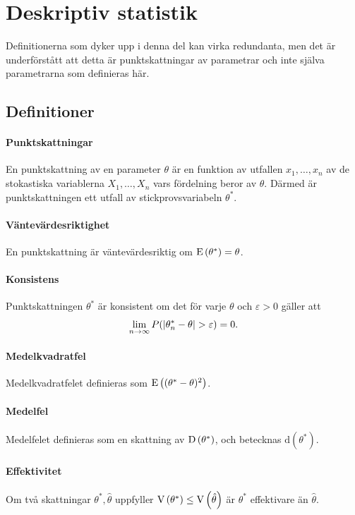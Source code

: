 \section{Deskriptiv statistik}
Definitionerna som dyker upp i denna del kan virka redundanta, men det är underförstått att detta är punktskattningar av parametrar och inte själva parametrarna som definieras här.

\subsection{Definitioner}

\paragraph{Punktskattningar}
En punktskattning av en parameter $\theta$ är en funktion av utfallen $x_1, \dots, x_n$ av de stokastiska variablerna $X_1, \dots, X_n$ vars fördelning beror av $\theta$. Därmed är punktskattningen ett utfall av stickprovsvariabeln $\theta^*$.

\paragraph{Väntevärdesriktighet}
En punktskattning är väntevärdesriktig om $\text{E}\left(\theta^*\right) = \theta$.

\paragraph{Konsistens}
Punktskattningen $\theta^*$ är konsistent om det för varje $\theta$ och $\varepsilon > 0$ gäller att
\begin{align*}
	\lim\limits_{n\to\infty}P(\abs{\theta_{n}^* - \theta} > \varepsilon) = 0.
\end{align*}

\paragraph{Medelkvadratfel}
Medelkvadratfelet definieras som $\text{E}\left((\theta^* - \theta)^2\right)$.

\paragraph{Medelfel}
Medelfelet definieras som en skattning av $\text{D}\left(\theta^*\right)$, och betecknas $\text{d}(\theta^*)$.

\paragraph{Effektivitet}
Om två skattningar $\theta^*, \hat{\theta}$ uppfyller $\text{V}\left(\theta^*\right)\leq\text{V}\left(\hat{\theta}\right)$ är $\theta^*$ effektivare än $\hat{\theta}$.

